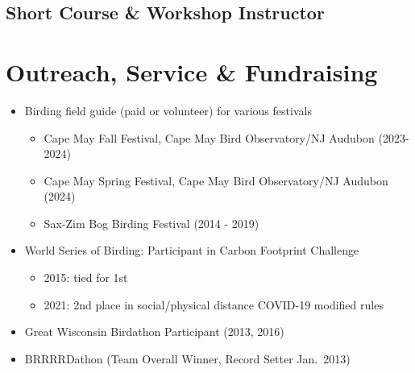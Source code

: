 \documentclass[11pt,a4paper,]{awesome-cv}
\providecommand{\tightlist}{%
	\setlength{\itemsep}{0pt}\setlength{\parskip}{0pt}}
\begin{document}
\begin{cvhonors}
\end{cvhonors}

\subsection{Short Course \& Workshop
Instructor}\label{short-course-workshop-instructor}

\begin{cvhonors}
\end{cvhonors}

\section{Outreach, Service \&
Fundraising}\label{outreach-service-fundraising}

\begin{itemize}
\tightlist
\item
  Birding field guide (paid or volunteer) for various festivals

  \begin{itemize}
  \tightlist
  \item
    Cape May Fall Festival, Cape May Bird Observatory/NJ Audubon
    (2023-2024)
  \item
    Cape May Spring Festival, Cape May Bird Observatory/NJ Audubon
    (2024)
  \item
    Sax-Zim Bog Birding Festival (2014 - 2019)
  \end{itemize}
\item
  World Series of Birding: Participant in Carbon Footprint Challenge

  \begin{itemize}
  \tightlist
  \item
    2015: tied for 1st
  \item
    2021: 2nd place in social/physical distance COVID-19 modified rules
  \end{itemize}
\item
  Great Wisconsin Birdathon Participant (2013, 2016)
\item
  BRRRRDathon (Team Overall Winner, Record Setter Jan.~2013)
\end{itemize}
\end{document}
